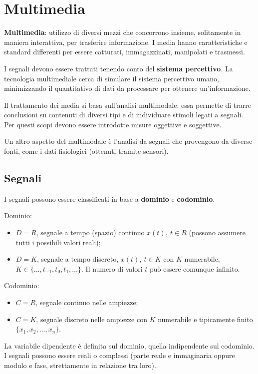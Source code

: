 \section{Multimedia}
\textbf{Multimedia}: utilizzo di diversi mezzi che concorrono insieme, solitamente in maniera interattiva, per trasferire informazione. I media hanno caratteristiche e standard differenti per essere catturati, immagazzinati, manipolati e trasmessi.

I segnali devono essere trattati tenendo conto del \textbf{sistema percettivo}. La tecnologia multimediale cerca di simulare il sistema percettivo umano, minimizzando il quantitativo di dati da processare per ottenere un'informazione.

Il trattamento dei media si basa sull'analisi multimodale: essa permette di trarre conclusioni su contenuti di diversi tipi e di individuare stimoli legati a segnali. Per questi scopi devono essere introdotte misure oggettive e soggettive.

Un altro aspetto del multimodale è l'analisi da segnali che provengono da diverse fonti, come i dati fisiologici (ottenuti tramite sensori). 

\subsection{Segnali}
I segnali possono essere classificati in base a \textbf{dominio} e \textbf{codominio}.

Dominio: 
\begin{itemize}
	\item $D = R$, segnale a tempo (spazio) continuo $x(t),\: t \in R$ (possono assumere tutti i possibili valori reali);
	\item $D = K$, segnale a tempo discreto, $x(t),\: t \in K$ con $K$ numerabile, $K \in \{\dots, t_{-1}, t_0, t_1, \dots\}$. Il numero di valori $t$ può essere comunque infinito.
\end{itemize}

Codominio:
\begin{itemize}
	\item $C = R$, segnale continuo nelle ampiezze;
	\item $C = K$, segnale discreto nelle ampiezze con $K$ numerabile e tipicamente finito $\{x_1, x_2, \dots, x_n\}$.
\end{itemize}

La variabile dipendente è definita sul dominio, quella indipendente sul codominio. I segnali possono essere reali o complessi (parte reale e immaginaria oppure modulo e fase, strettamente in relazione tra loro).

